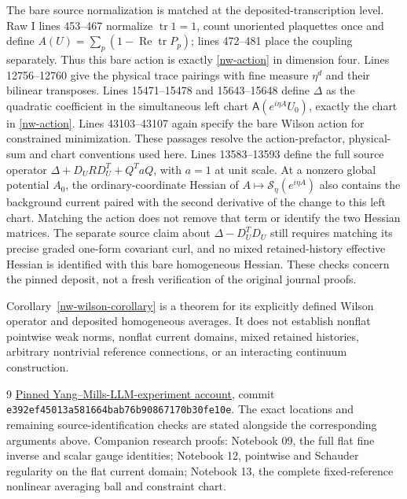 \documentclass[11pt]{article}
\theoremstyle{remark}
\begin{document}
The bare source normalization is matched at the deposited-transcription level.
Raw I lines 453--467 normalize $\operatorname{tr}1=1$, count
unoriented plaquettes once and define
$A(U)=\sum_p(1-\operatorname{Re}\operatorname{tr}P_p)$;
lines 472--481 place the coupling separately. Thus this bare action
is exactly \eqref{nw-action} in dimension four.
Lines 12756--12760 give the physical trace pairings with fine measure
$\eta^d$ and their bilinear transposes. Lines 15471--15478 and
15643--15648 define $\Delta$ as the quadratic coefficient in the
simultaneous left chart $\mathsf A(e^{i\eta A}U_0)$, exactly the chart
in \eqref{nw-action}. Lines 43103--43107 again specify the bare
Wilson action for constrained minimization. These passages resolve
the action-prefactor, physical-sum and chart conventions used here.
Lines 13583--13593 define the full source operator
$\Delta+D_URD_U^T+Q^TaQ$, with $a=1$ at unit scale.
At a nonzero global potential $A_0$, the ordinary-coordinate Hessian
of $A\mapsto\mathcal S_\eta(e^{i\eta A})$ also contains the background
current paired with the second derivative of the change to this left
chart. Matching the action does not remove that term or identify the
two Hessian matrices. The separate source claim about
$\Delta-D_U^TD_U$ still requires matching its precise graded
one-form covariant curl, and no mixed retained-history effective
Hessian is identified with this bare homogeneous Hessian.
These checks concern the pinned deposit, not a fresh verification
of the original journal proofs.

Corollary~\ref{nw-wilson-corollary} is a theorem for its explicitly
defined Wilson operator and deposited homogeneous averages.
It does not establish nonflat pointwise weak norms, nonflat current
domains, mixed retained histories, arbitrary nontrivial reference
connections, or an interacting continuum construction.

\begin{thebibliography}{9}
\href{https://github.com/ethanwsussman/Yang--Mills-LLM-experiment/tree/e392ef45013a581664bab76b90867170b30fe10e}
{Pinned Yang--Mills-LLM-experiment account}, commit
\texttt{e392ef4501\allowbreak 3a581664ba\allowbreak b76b908671\allowbreak 70b30fe10e}.
The exact locations and remaining source-identification checks are stated
alongside the corresponding arguments above.
Companion research proofs: Notebook 09, the full flat fine inverse
and scalar gauge identities; Notebook 12, pointwise and Schauder
regularity on the flat current domain; Notebook 13, the complete
fixed-reference nonlinear averaging ball and constraint chart.
\end{thebibliography}
\end{document}
